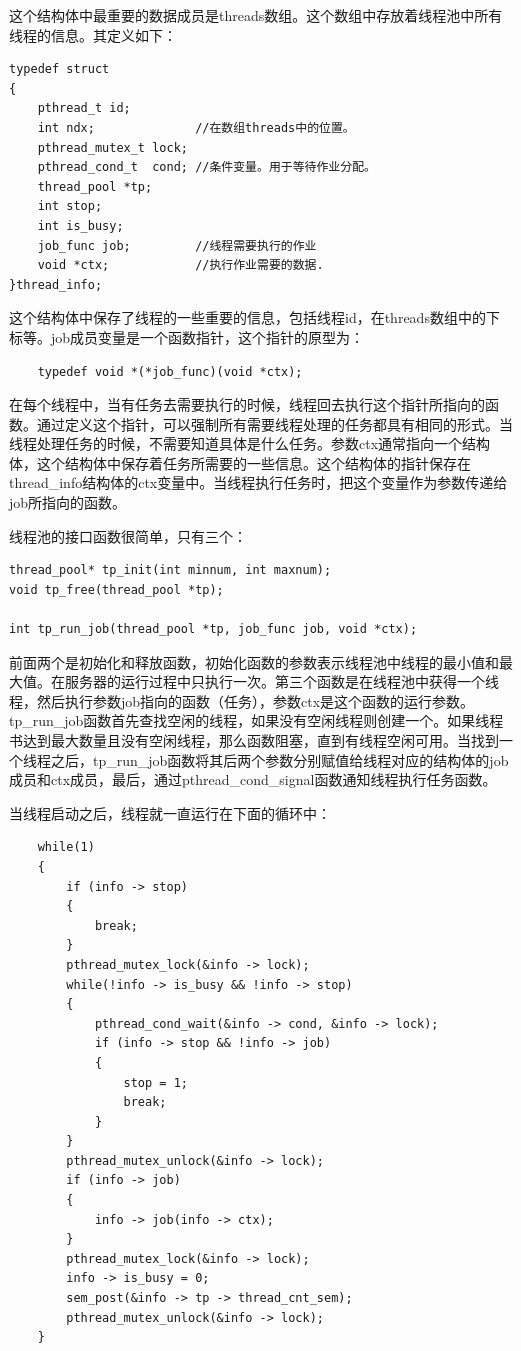 \documentclass[12pt, twoside, a4paper, xetex]{report}
\begin{document}
	这个结构体中最重要的数据成员是threads数组。这个数组中存放着线程池中所有线程的信息。其定义如下：

\begin{verbatim}	
typedef struct 
{
	pthread_t id; 
	int ndx;              //在数组threads中的位置。
	pthread_mutex_t lock; 
	pthread_cond_t  cond; //条件变量。用于等待作业分配。
	thread_pool *tp;
	int stop;
	int is_busy;
	job_func job;         //线程需要执行的作业
	void *ctx;            //执行作业需要的数据.
}thread_info;
\end{verbatim}

	这个结构体中保存了线程的一些重要的信息，包括线程id，在threads数组中的下标等。job成员变量是一个函数指针，这个指针的原型为：
\begin{verbatim}
	typedef void *(*job_func)(void *ctx); 
\end{verbatim}

	在每个线程中，当有任务去需要执行的时候，线程回去执行这个指针所指向的函数。通过定义这个指针，可以强制所有需要线程处理的任务都具有相同的形式。当线程处理任务的时候，不需要知道具体是什么任务。参数ctx通常指向一个结构体，这个结构体中保存着任务所需要的一些信息。这个结构体的指针保存在thread\_info结构体的ctx变量中。当线程执行任务时，把这个变量作为参数传递给job所指向的函数。
	
	线程池的接口函数很简单，只有三个：
\begin{verbatim}
thread_pool* tp_init(int minnum, int maxnum);
void tp_free(thread_pool *tp);

int tp_run_job(thread_pool *tp, job_func job, void *ctx);
\end{verbatim}

	前面两个是初始化和释放函数，初始化函数的参数表示线程池中线程的最小值和最大值。在服务器的运行过程中只执行一次。第三个函数是在线程池中获得一个线程，然后执行参数job指向的函数（任务），参数ctx是这个函数的运行参数。tp\_run\_job函数首先查找空闲的线程，如果没有空闲线程则创建一个。如果线程书达到最大数量且没有空闲线程，那么函数阻塞，直到有线程空闲可用。当找到一个线程之后，tp\_run\_job函数将其后两个参数分别赋值给线程对应的结构体的job成员和ctx成员，最后，通过pthread\_cond\_signal函数通知线程执行任务函数。
	
	当线程启动之后，线程就一直运行在下面的循环中：

\begin{verbatim}
	while(1)
	{
		if (info -> stop)
		{
			break;
		}
		pthread_mutex_lock(&info -> lock);
		while(!info -> is_busy && !info -> stop)
		{
			pthread_cond_wait(&info -> cond, &info -> lock);
			if (info -> stop && !info -> job)
			{
				stop = 1;
				break;
			}
		}
		pthread_mutex_unlock(&info -> lock);
		if (info -> job)
		{
			info -> job(info -> ctx);
		}
		pthread_mutex_lock(&info -> lock);
		info -> is_busy = 0;
		sem_post(&info -> tp -> thread_cnt_sem);
		pthread_mutex_unlock(&info -> lock);
	}
\end{verbatim}
\end{document}
